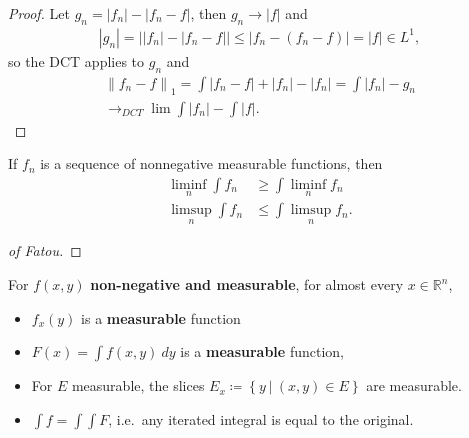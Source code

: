 \begin{proof}

Let
\(g_n = {\left\lvert {f_n} \right\rvert} - {\left\lvert {f_n - f} \right\rvert}\),
then \(g_n \to {\left\lvert {f} \right\rvert}\) and
\begin{align*}
{\left\lvert {g_n} \right\rvert} = {\left\lvert { {\left\lvert {f_n} \right\rvert} - {\left\lvert {f_n - f} \right\rvert} } \right\rvert} \leq {\left\lvert {f_n - (f_n - f)} \right\rvert} = {\left\lvert {f} \right\rvert} \in L^1
,\end{align*}
so the DCT applies to \(g_n\) and
\begin{align*}
{\left\lVert {f_n - f} \right\rVert}_1 = \int {\left\lvert {f_n - f} \right\rvert} + {\left\lvert {f_n} \right\rvert} - {\left\lvert {f_n} \right\rvert}
= \int {\left\lvert {f_n} \right\rvert} - g_n\\
\to_{DCT} \lim \int {\left\lvert {f_n} \right\rvert} - \int {\left\lvert {f} \right\rvert}
.\end{align*}

\end{proof}

\begin{theorem}[Fatou]

If \(f_n\) is a sequence of nonnegative measurable functions, then
\begin{align*}
\liminf_n \int f_n 
&\geq \int \liminf_n f_n \\
\limsup_n \int f_n &\leq \int \limsup_n f_n
.\end{align*}

\end{theorem}

\begin{proof}[of Fatou]


\end{proof}

\begin{theorem}

For \(f(x, y)\) \textbf{non-negative and measurable}, for almost every
\(x\in {\mathbb{R}}^n\),

\begin{itemize}
\tightlist
\item
  \(f_x(y)\) is a \textbf{measurable} function
\item
  \(F(x) = \int f(x, y) ~dy\) is a \textbf{measurable} function,
\item
  For \(E\) measurable, the slices
  \(E_x \coloneqq\left\{{y {~\mathrel{\Big|}~}(x, y) \in E}\right\}\)
  are measurable.
\item
  \(\int f = \int \int F\), i.e.~any iterated integral is equal to the
  original.
\end{itemize}

\end{theorem}


